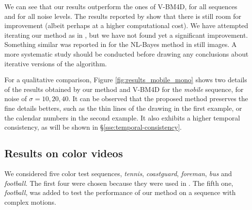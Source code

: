 \documentclass[10pt, journal, twocolumn, final, a4paper]{IEEEtran}
\newcommand{\pcomment}[1]{}
\begin{document}
We can see that our results outperform the ones of V-BM4D, for all sequences and 
for all noise levels. The results reported by \cite{LiZhangDai2011} show that there
is still room for improvement (albeit perhaps at a higher computational cost).
%
We have attempted iterating our method as in \cite{LiZhangDai2011},
but we have not found yet a significant improvement. Something similar was
reported in \cite{Lebrun2013ipol,Lebrun2013a} for the NL-Bayes method in still
images. %
A more systematic study should be conducted before drawing any
conclusions about iterative versions of the algorithm.

For a qualitative comparison, Figure \ref{fig:results_mobile_mono}
shows two details of the results obtained by our method and V-BM4D for the
\emph{mobile} sequence, for noise of $\sigma = 10, 20, 40$. It can be observed
that the proposed method preserves the fine details betters, such as the thin
lines of the drawing in the first example, or the calendar numbers in the
second example. It also exhibits a higher temporal consistency, as will be
shown in \S \ref{sse:temporal-consistency}.



\subsection{Results on color videos}

We considered five color test sequences, \emph{tennis}, \emph{coastguard},
\emph{foreman}, \emph{bus} and \emph{football}. The first four were chosen
because they were used in \cite{Maggioni2012}. The fifth one, \emph{football},
was added to test the performance of our method on a sequence with complex motions.
\end{document}
